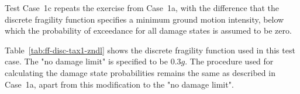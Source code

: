 Test Case~1c repeats the exercise from Case~1a, with the difference that the discrete fragility function specifies a minimum ground motion intensity, below which the probability of exceedance for all damage states is assumed to be zero.

Table~\ref{tab:ff-disc-tax1-zndl} shows the discrete fragility function used in this test case. The "no damage limit" is specified to be $0.3 g$. The procedure used for calculating the damage state probabilities remains the same as described in Case~1a, apart from this modification to the "no damage limit".
